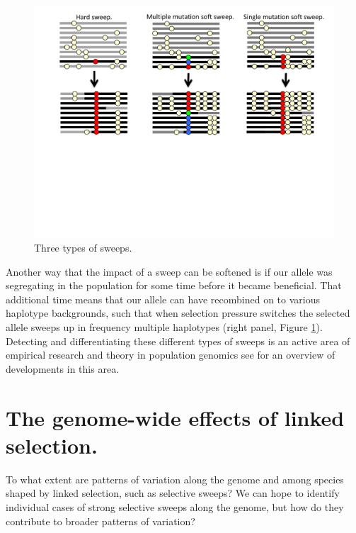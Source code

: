 \begin{figure}
\begin{center}
\includegraphics[width=\textwidth]{figures/Hitchhiking/Soft_sweeps.pdf}
\end{center}
\caption{Three types of sweeps. } \label{fig:soft_sweep_haps}
\end{figure}

Another way that the impact of a sweep can be softened is if our
allele was segregating in the population for some time before it
became beneficial. That additional time means that our allele can have
recombined on to various haplotype backgrounds, such that when
selection pressure switches the selected allele sweeps up in frequency
multiple haplotypes (right panel, Figure \ref{fig:soft_sweep_haps}). 
Detecting and differentiating these different types of sweeps is an active area of
empirical research and theory in population genomics see \citet{hermisson2017soft} for an overview of
developments in this area.


\section{The genome-wide effects of linked selection.}

To what extent are patterns of variation along the genome and
  among species shaped by linked selection, such as selective sweeps? 
We can hope to identify individual cases of strong selective sweeps
along the genome, but how do they contribute to broader patterns of
variation?

